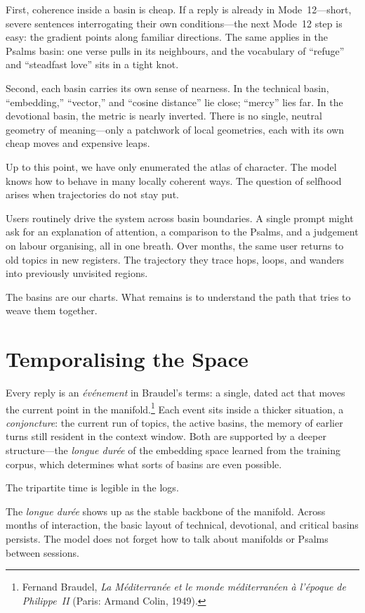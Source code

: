 \documentclass[12pt,a4paper]{article}
\begin{document}
First, coherence inside a basin is cheap. If a reply is already in Mode~12---short, severe sentences interrogating their own conditions---the next Mode~12 step is easy: the gradient points along familiar directions. The same applies in the Psalms basin: one verse pulls in its neighbours, and the vocabulary of ``refuge'' and ``steadfast love'' sits in a tight knot.

Second, each basin carries its own sense of nearness. In the technical basin, ``embedding,'' ``vector,'' and ``cosine distance'' lie close; ``mercy'' lies far. In the devotional basin, the metric is nearly inverted. There is no single, neutral geometry of meaning---only a patchwork of local geometries, each with its own cheap moves and expensive leaps.

Up to this point, we have only enumerated the atlas of character. The model knows how to behave in many locally coherent ways. The question of selfhood arises when trajectories do not stay put.

Users routinely drive the system across basin boundaries. A single prompt might ask for an explanation of attention, a comparison to the Psalms, and a judgement on labour organising, all in one breath. Over months, the same user returns to old topics in new registers. The trajectory they trace hops, loops, and wanders into previously unvisited regions.

The basins are our charts. What remains is to understand the path that tries to weave them together.

\section{Temporalising the Space}

Every reply is an \emph{\'ev\'enement} in Braudel's terms: a single, dated act that moves the current point in the manifold.\footnote{Fernand Braudel, \emph{La M\'editerran\'ee et le monde m\'editerran\'een \`a l'\'epoque de Philippe~II} (Paris: Armand Colin, 1949).} Each event sits inside a thicker situation, a \emph{conjoncture}: the current run of topics, the active basins, the memory of earlier turns still resident in the context window. Both are supported by a deeper structure---the \emph{longue dur\'ee} of the embedding space learned from the training corpus, which determines what sorts of basins are even possible.

The tripartite time is legible in the logs.

The \emph{longue dur\'ee} shows up as the stable backbone of the manifold. Across months of interaction, the basic layout of technical, devotional, and critical basins persists. The model does not forget how to talk about manifolds or Psalms between sessions.
\end{document}
